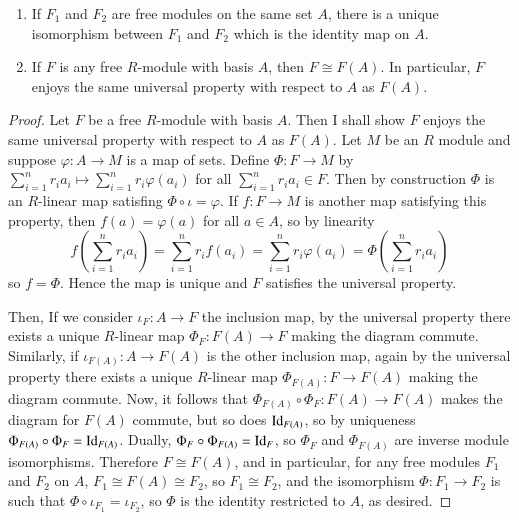 \documentclass[12pt, a4paper, oneside, openright, titlepage]{book}
\begin{document}
\begin{cor}
    \leavevmode
    \begin{enumerate}
        \item If $F_1$ and $F_2$ are free modules on the same set $A$, there is a unique isomorphism between $F_1$ and $F_2$ which is the identity map on $A$.
        \item If $F$ is any free $R$-module with basis $A$, then $F\cong F(A)$. In particular, $F$ enjoys the same universal property with respect to $A$ as $F(A)$.
    \end{enumerate}
\end{cor}
\begin{proof}
    Let $F$ be a free $R$-module with basis $A$. Then I shall show $F$ enjoys the same universal property with respect to $A$ as $F(A)$. Let $M$ be an $R$ module and suppose $\varphi:A\rightarrow M$ is a map of sets. Define $\Phi:F\rightarrow M$ by $\sum_{i=1}^nr_ia_i \mapsto \sum_{i=1}^nr_i\varphi(a_i)$ for all $\sum_{i=1}^nr_ia_i \in F$. Then by construction $\Phi$ is an $R$-linear map satisfing $\Phi\circ \iota = \varphi$. If $f:F\rightarrow M$ is another map satisfying this property, then $f(a) = \varphi(a)$ for all $a \in A$, so by linearity $$f\left(\sum_{i=1}^nr_ia_i\right) = \sum_{i=1}^nr_if(a_i) = \sum_{i=1}^nr_i\varphi(a_i) = \Phi\left(\sum_{i=1}^nr_ia_i\right)$$
    so $f = \Phi$. Hence the map is unique and $F$ satisfies the universal property. 

    Then, If we consider $\iota_F:A\rightarrow F$ the inclusion map, by the universal property there exists a unique $R$-linear map $\Phi_F:F(A) \rightarrow F$ making the diagram commute. Similarly, if $\iota_{F(A)}:A\rightarrow F(A)$ is the other inclusion map, again by the universal property there exists a unique $R$-linear map $\Phi_{F(A)}:F\rightarrow F(A)$ making the diagram commute. Now, it follows that $\Phi_{F(A)}\circ \Phi_F:F(A) \rightarrow F(A)$ makes the diagram for $F(A)$ commute, but so does $\operatorname{Id}_{F(A)}$, so by uniqueness $\Phi_{F(A)}\circ\Phi_F = \operatorname{Id}_{F(A)}$. Dually, $\Phi_F\circ \Phi_{F(A)} = \operatorname{Id}_F$, so $\Phi_F$ and $\Phi_{F(A)}$ are inverse module isomorphisms. Therefore $F\cong F(A)$, and in particular, for any free modules $F_1$ and $F_2$ on $A$, $F_1 \cong F(A) \cong F_2$, so $F_1 \cong F_2$, and the isomorphism $\Phi:F_1 \rightarrow F_2$ is such that $\Phi\circ \iota_{F_1} = \iota_{F_2}$, so $\Phi$ is the identity restricted to $A$, as desired.
\end{proof}
\end{document}
